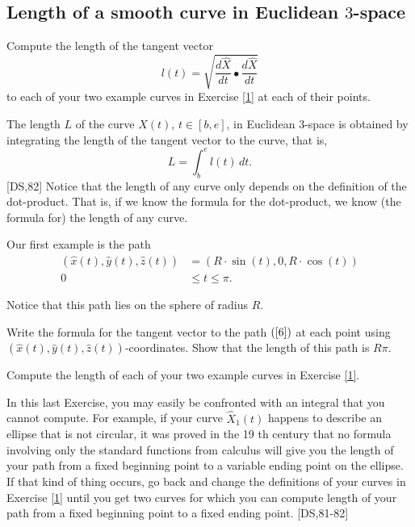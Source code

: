 \documentclass{ximera}
\begin{document}
\subsection*{Length of a smooth curve in Euclidean $3$-space}

\begin{exercise}
Compute the length of the tangent vector
\[
l(t)=\sqrt{\frac{d\hat{X}}{dt}\bullet\frac{d\hat{X}}{dt}}%
\]
to each of your two example curves in Exercise \ref{1} at each of their points.
\end{exercise}

\begin{definition}
The length $L$ of the curve $\hat{X}\left(  t\right)  $, $t\in\left[
b,e\right]  $, in Euclidean $3$-space is obtained by integrating the length of
the tangent vector to the curve, that is,%
\[
L=
{\displaystyle\int\nolimits_{b}^{e}}
l\left(  t\right)  \,dt.
\]
[DS,82] Notice that the length of any curve only depends on the definition of
the dot-product. That is, if we know the formula for the dot-product, we know
(the formula for) the length of any curve.
\end{definition}

Our first example is the path%
\begin{align}
\left(  \hat{x}\left(  t\right)  ,\hat{y}\left(  t\right)  ,\hat{z}\left(
t\right)  \right)   &  =\left(  R\cdot \sin\left(  t\right)  ,0,R\cdot
\cos\left(  t\right)  \right) \label{6}\\
0\,  &  \leq t\leq\pi.
\end{align}


Notice that this path lies on the sphere of radius $R$.

\begin{exercise}
Write the formula for the tangent vector to the path $\left(  \ref{6}\right)
$ at each point using $\left(  \hat{x}\left(  t\right)  ,\hat{y}\left(
t\right)  ,\hat{z}\left(  t\right)  \right)  $-coordinates. Show that the
length of this path is $R\pi$.
\end{exercise}

\begin{exercise}
Compute the length of each of your two example curves in Exercise \ref{1}.
\end{exercise}

\begin{remark}
In this last Exercise, you may easily be confronted with an integral that you
cannot compute. For example, if your curve $\hat{X}_{1}\left(  t\right)  $
happens to describe an ellipse that is not circular, it was proved in the 19
th century that no formula involving only the standard functions from calculus
will give you the length of your path from a fixed beginning point to a
variable ending point on the ellipse. If that kind of thing occurs, go back
and change the definitions of your curves in Exercise \ref{1} until you get
two curves for which you can compute length of your path from a fixed
beginning point to a fixed ending point. [DS,81-82]
\end{remark}
\end{document}
